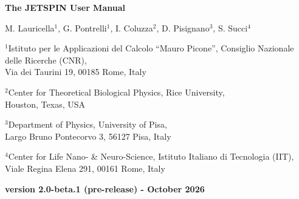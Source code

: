 \documentclass[oneside,english]{book}
\begin{document}
\thispagestyle{empty}

\vspace*{3cm}

\begin{center}
\textbf{\huge{}{}The JETSPIN User Manual}{\huge{} }
\par\end{center}{\huge \par}

\bigskip{}

\begin{center}
{\large
M. Lauricella$^{1}$, G. Pontrelli$^{1}$, I. Coluzza$^{2}$,
D. Pisignano$^{3}$, S. Succi$^{4}$
}
\end{center}

\medskip{}

\begin{center}
{\large
$^{1}$Istituto per le Applicazioni del Calcolo ``Mauro Picone'',
Consiglio Nazionale delle Ricerche (CNR),\\
Via dei Taurini 19, 00185 Rome, Italy
}
\end{center}

\smallskip{}

\begin{center}
{\large
$^{2}$Center for Theoretical Biological Physics,
Rice University,\\
Houston, Texas, USA
}
\end{center}

\smallskip{}

\begin{center}
{\large
$^{3}$Department of Physics, University of Pisa,\\
Largo Bruno Pontecorvo 3, 56127 Pisa, Italy
}
\end{center}

\smallskip{}

\begin{center}
{\large
$^{4}$Center for Life Nano- \& Neuro-Science,
Istituto Italiano di Tecnologia (IIT),\\
Viale Regina Elena 291, 00161 Rome, Italy
}
\end{center}

\medskip{}

\begin{center}
\textbf{\large version 2.0-beta.1 (pre-release) - October 2026}
\end{center}

\newpage{}

\setcounter{page}{1}
\end{document}
